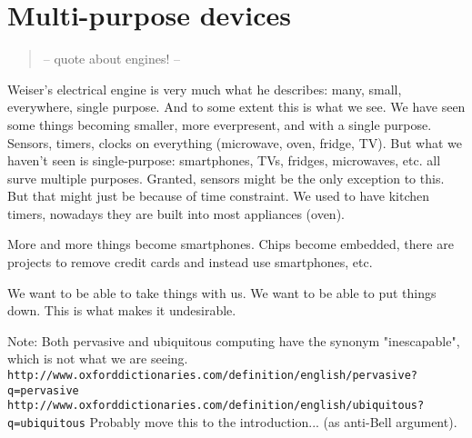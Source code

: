 \section{Multi-purpose devices}

\begin{quote}
    -- quote about engines! --
\end{quote}

Weiser's electrical engine is very much what he describes: many, small, everywhere, single purpose. And to some extent
this is what we see. We have seen some things becoming smaller, more everpresent, and with a single purpose. Sensors, timers,
clocks on everything (microwave, oven, fridge, TV). But what we haven't seen is single-purpose: smartphones, TVs, fridges,
microwaves, etc. all surve multiple purposes. Granted, sensors might be the only exception to this. But that might just 
be because of time constraint. We used to have kitchen timers, nowadays they are built into most appliances (oven).

More and more things become smartphones. Chips become embedded, there are projects to remove credit cards and instead use
smartphones, etc.

We want to be able to take things with us. We want to be able to put things down. This is what makes it undesirable.

Note: Both pervasive and ubiquitous computing have the synonym "inescapable", which is not what we are seeing.
\verb+http://www.oxforddictionaries.com/definition/english/pervasive?q=pervasive+
\verb+http://www.oxforddictionaries.com/definition/english/ubiquitous?q=ubiquitous+
Probably move this to the introduction... (as anti-Bell argument).